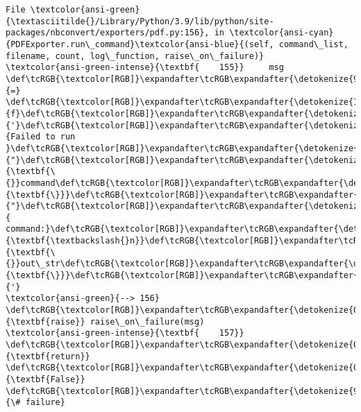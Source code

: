 \documentclass[11pt]{article}
\begin{document}
\begin{Verbatim}[commandchars=\\\{\}, frame=single, framerule=2mm, rulecolor=\color{outerrorbackground}]
File \textcolor{ansi-green}{\textasciitilde{}/Library/Python/3.9/lib/python/site-packages/nbconvert/exporters/pdf.py:156}, in \textcolor{ansi-cyan}{PDFExporter.run\_command}\textcolor{ansi-blue}{(self, command\_list, filename, count, log\_function, raise\_on\_failure)}
\textcolor{ansi-green-intense}{\textbf{    155}}     msg \def\tcRGB{\textcolor[RGB]}\expandafter\tcRGB\expandafter{\detokenize{98,98,98}}{=} \def\tcRGB{\textcolor[RGB]}\expandafter\tcRGB\expandafter{\detokenize{175,0,0}}{f}\def\tcRGB{\textcolor[RGB]}\expandafter\tcRGB\expandafter{\detokenize{175,0,0}}{'}\def\tcRGB{\textcolor[RGB]}\expandafter\tcRGB\expandafter{\detokenize{175,0,0}}{Failed to run }\def\tcRGB{\textcolor[RGB]}\expandafter\tcRGB\expandafter{\detokenize{175,0,0}}{"}\def\tcRGB{\textcolor[RGB]}\expandafter\tcRGB\expandafter{\detokenize{175,95,135}}{\textbf{\{}}command\def\tcRGB{\textcolor[RGB]}\expandafter\tcRGB\expandafter{\detokenize{175,95,135}}{\textbf{\}}}\def\tcRGB{\textcolor[RGB]}\expandafter\tcRGB\expandafter{\detokenize{175,0,0}}{"}\def\tcRGB{\textcolor[RGB]}\expandafter\tcRGB\expandafter{\detokenize{175,0,0}}{ command:}\def\tcRGB{\textcolor[RGB]}\expandafter\tcRGB\expandafter{\detokenize{175,95,0}}{\textbf{\textbackslash{}n}}\def\tcRGB{\textcolor[RGB]}\expandafter\tcRGB\expandafter{\detokenize{175,95,135}}{\textbf{\{}}out\_str\def\tcRGB{\textcolor[RGB]}\expandafter\tcRGB\expandafter{\detokenize{175,95,135}}{\textbf{\}}}\def\tcRGB{\textcolor[RGB]}\expandafter\tcRGB\expandafter{\detokenize{175,0,0}}{'}
\textcolor{ansi-green}{--> 156}     \def\tcRGB{\textcolor[RGB]}\expandafter\tcRGB\expandafter{\detokenize{0,135,0}}{\textbf{raise}} raise\_on\_failure(msg)
\textcolor{ansi-green-intense}{\textbf{    157}} \def\tcRGB{\textcolor[RGB]}\expandafter\tcRGB\expandafter{\detokenize{0,135,0}}{\textbf{return}} \def\tcRGB{\textcolor[RGB]}\expandafter\tcRGB\expandafter{\detokenize{0,135,0}}{\textbf{False}}  \def\tcRGB{\textcolor[RGB]}\expandafter\tcRGB\expandafter{\detokenize{95,135,135}}{\# failure}


\end{Verbatim}
\end{document}
